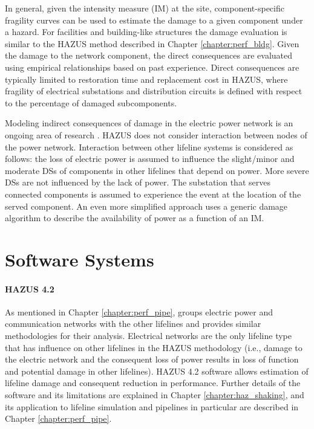 In general, given the intensity measure (IM) at the site, component-specific fragility curves can be used to estimate the damage to a given component under a hazard. For facilities and building-like structures the damage evaluation is similar to the HAZUS method described in Chapter \ref{chapter:perf_bldg}. Given the damage to the network component, the direct consequences are evaluated using empirical relationships based on past experience. Direct consequences are typically limited to restoration time and replacement cost in HAZUS, where fragility of electrical substations and distribution circuits is defined with respect to the percentage of damaged subcomponents.

Modeling indirect consequences of damage in the electric power network is an ongoing area of research \citep{moore2005using}. HAZUS does not consider interaction between nodes of the power network. Interaction between other lifeline systems is considered as follows: the loss of electric power is assumed to influence the slight/minor and moderate DSs of components in other lifelines that depend on power. More severe DSs are not influenced by the lack of power. The substation that serves connected components is assumed to experience the event at the location of the served component. An even more simplified approach uses a generic damage algorithm to describe the availability of power as a function of an IM. 

\section{Software Systems}
\label{sec:perf_power_tools}

\paragraph{HAZUS 4.2} As mentioned in Chapter \ref{chapter:perf_pipe},  groups electric power and communication networks with the other lifelines and provides similar methodologies for their analysis. Electrical networks are the only lifeline type that has influence on other lifelines in the HAZUS methodology (i.e., damage to the electric network and the consequent loss of power results in loss of function and potential damage in other lifelines). HAZUS 4.2 software allows estimation of lifeline damage and consequent reduction in performance. Further details of the software and its limitations are explained in Chapter \ref{chapter:haz_shaking}, and its application to lifeline simulation and pipelines in particular are described in Chapter \ref{chapter:perf_pipe}.

